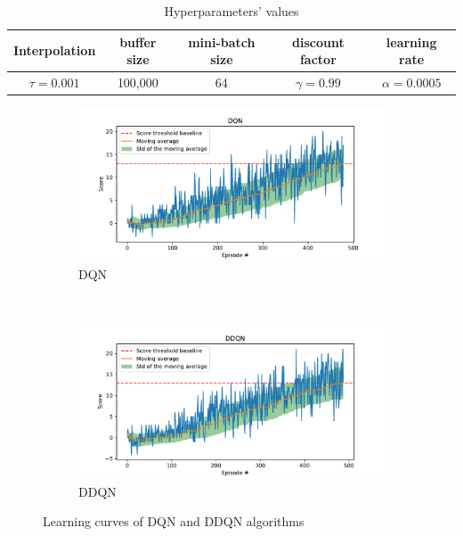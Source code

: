 \documentclass[12pt,english]{article}
\begin{document}
\begin{table}
\footnotesize
{
  \caption{Hyperparameters' values}\label{tb:parameters}
  \centering
  \begin{tabular}{ccccc}
  \toprule
    \textbf{Interpolation} & \textbf{buffer size} & \textbf{mini-batch size} & \textbf{discount factor} & \textbf{learning rate} \\
  \midrule
  \(\tau=0.001\) & 100,000 & 64 & \(\gamma = 0.99\) & \(\alpha = 0.0005\)\\
  \bottomrule
  \end{tabular}
}
\end{table}

\begin{figure}%
    \centering
    \begin{subfigure}[t]{0.5\textwidth}
        \centering
        \includegraphics[width=\textwidth]{dqn_score}
        \caption{DQN}\label{fig:dqn}
    \end{subfigure}%
    ~ 
    \begin{subfigure}[t]{0.5\textwidth}
        \centering
        \includegraphics[width=\textwidth]{ddqn_score}
        \caption{DDQN}\label{fig:ddqn}
    \end{subfigure}
    \caption{Learning curves of DQN and DDQN algorithms}\label{fig:scores}
\end{figure}


\end{document}

